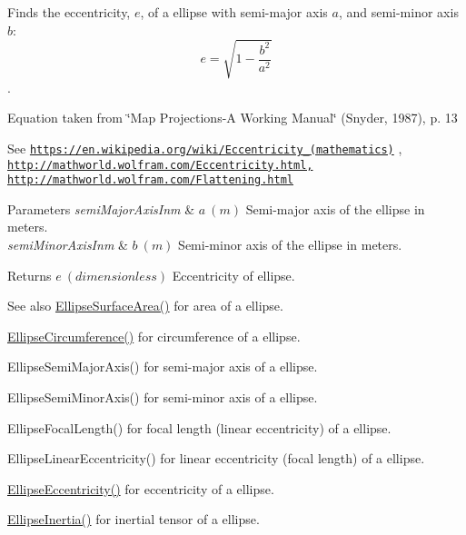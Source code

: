 Finds the eccentricity, $e$, of a ellipse with semi-\/major axis $a$, and semi-\/minor axis $b$\+: \[ e = \sqrt{1-\frac{b^2}{a^2}}\]. 

Equation taken from \char`\"{}\+Map Projections-\/\+A Working Manual\char`\"{} (Snyder, 1987), p. 13

See \href{https://en.wikipedia.org/wiki/Eccentricity_(mathematics)}{\tt https\+://en.\+wikipedia.\+org/wiki/\+Eccentricity\+\_\+(mathematics)} , \href{http://mathworld.wolfram.com/Eccentricity.html,}{\tt http\+://mathworld.\+wolfram.\+com/\+Eccentricity.\+html,} \href{http://mathworld.wolfram.com/Flattening.html}{\tt http\+://mathworld.\+wolfram.\+com/\+Flattening.\+html} 
\begin{DoxyParams}{Parameters}
{\em semi\+Major\+Axis\+Inm} & $ a\ (m)$ Semi-\/major axis of the ellipse in meters. \\
\hline
{\em semi\+Minor\+Axis\+Inm} & $ b\ (m)$ Semi-\/minor axis of the ellipse in meters. \\
\hline
\end{DoxyParams}
\begin{DoxyReturn}{Returns}
$ e\ (dimensionless)$ Eccentricity of ellipse. 
\end{DoxyReturn}
\begin{DoxySeeAlso}{See also}
\mbox{\hyperlink{group___e_g_x_math-_geometry-2_d-_ellipse-_surface_area_ga4ce8c8323e9718ce5458f4ab7f6d823d}{Ellipse\+Surface\+Area()}} for area of a ellipse. 

\mbox{\hyperlink{group___e_g_x_math-_geometry-2_d-_ellipse-_circumference_ga4172802ac674eb53467b44928ac635c7}{Ellipse\+Circumference()}} for circumference of a ellipse. 

Ellipse\+Semi\+Major\+Axis() for semi-\/major axis of a ellipse. 

Ellipse\+Semi\+Minor\+Axis() for semi-\/minor axis of a ellipse. 

Ellipse\+Focal\+Length() for focal length (linear eccentricity) of a ellipse. 

Ellipse\+Linear\+Eccentricity() for linear eccentricity (focal length) of a ellipse. 

\mbox{\hyperlink{group___e_g_x_math-_geometry-2_d-_ellipse-_eccentricity_ga4e01cf027d303bb4ecb75606e5240d6c}{Ellipse\+Eccentricity()}} for eccentricity of a ellipse. 

\mbox{\hyperlink{group___e_g_x_math-_geometry-2_d-_ellipse-_inertia_ga10a3049c2f04b50f271fb01dc62e4cf8}{Ellipse\+Inertia()}} for inertial tensor of a ellipse. 
\end{DoxySeeAlso}
